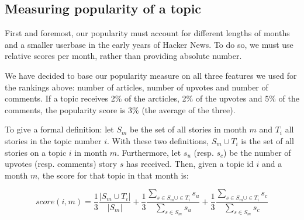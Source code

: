 \subsection{Measuring popularity of a topic}
First and foremost, our popularity must account for different lengths of months and a smaller userbase in the early years of Hacker News. To do so, we must use relative scores per month, rather than providing absolute number.

We have decided to base our popularity measure on all three features we used for the rankings above: number of articles, number of upvotes and number of comments. If a topic receives 2\% of the arcticles, 2\% of the upvotes and 5\% of the comments, the popularity score is 3\% (the average of the three).

To give a formal definition: let $S_m$ be the set of all stories in month $m$ and $T_i$ all stories in the topic number $i$. With these two definitions, $S_m \cup T_i$ is the set of all stories on a topic $i$ in month $m$. Furthermore, let $s_u$ (resp. $s_c$) be the number of upvotes (resp. comments) story $s$ has received. Then, given a topic id $i$ and a month $m$, the score for that topic in that month is:

$$
	score(i, m) = 
		\frac{1}{3} \frac{|S_m \cup T_i|}{|S_m|} + 
		\frac{1}{3} \frac{\sum_{s \in S_m \cup \in T_i} s_u}{\sum_{s \in S_m} s_u}  + 
		\frac{1}{3} \frac{\sum_{s \in S_m \cup \in T_i} s_c}{\sum_{s \in S_m} s_c}
$$
